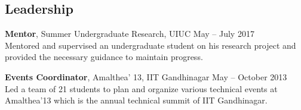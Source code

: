 \documentclass[margin]{res}
\begin{document}
\begin{resume}
\section{\large Leadership}
{\bf Mentor}, Summer Undergraduate Research, UIUC \hfill May -- July 2017 \\
Mentored and supervised an undergraduate student on his research project and provided the necessary guidance to maintain progress.

{\bf Events Coordinator}, Amalthea' 13, IIT Gandhinagar \hfill May -- October 2013 \\
Led a team of 21 students to plan and organize various technical events at Amalthea'13 which is the annual technical summit of IIT Gandhinagar.

%
%

\end{resume}
\end{document}
